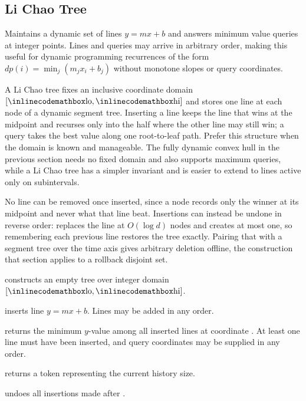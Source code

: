 \subsection{Li Chao Tree}
\label{sec:5.3.7}
Maintains a dynamic set of lines $y = mx + b$ and answers minimum value queries at integer points. Lines and queries may arrive in arbitrary order, making this useful for dynamic programming recurrences of the form $dp(i) = \min_j (m_j x_i + b_j)$ without monotone slopes or query coordinates.

A Li Chao tree fixes an inclusive coordinate domain $[{\inlinecodemath{lo}}, {\inlinecodemath{hi}}]$ and stores one line at each node of a dynamic segment tree. Inserting a line keeps the line that wins at the midpoint and recurses only into the half where the other line may still win; a query takes the best value along one root-to-leaf path. Prefer this structure when the domain is known and manageable. The fully dynamic convex hull in the previous section needs no fixed domain and also supports maximum queries, while a Li Chao tree has a simpler invariant and is easier to extend to lines active only on subintervals.

No line can be removed once inserted, since a node records only the winner at its midpoint and never what that line beat. Insertions can instead be undone in reverse order:  replaces the line at $O(\log d)$ nodes and creates at most one, so remembering each previous line restores the tree exactly. Pairing that with a segment tree over the time axis gives arbitrary deletion offline, the construction that section  applies to a rollback disjoint set.

\begin{compactitem}
  \item {} constructs an empty tree over integer domain $[{\inlinecodemath{lo}}, {\inlinecodemath{hi}}]$.
  \item {} inserts line $y = mx + b$. Lines may be added in any order.
  \item {} returns the minimum $y$-value among all inserted lines at coordinate . At least one line must have been inserted, and query coordinates may be supplied in any order.
  \item {} returns a token representing the current history size.
  \item {} undoes all insertions made after .
\end{compactitem}

